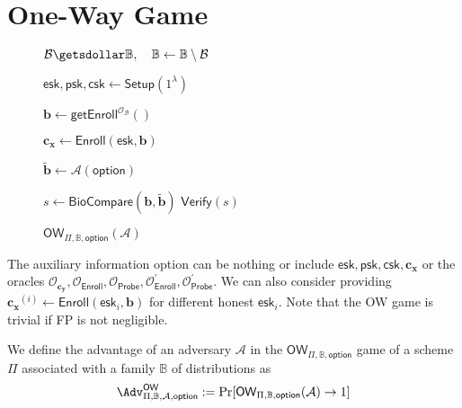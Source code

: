 
\newpage



\section{One-Way Game}

\begin{figure}[h]
\centering

	\begin{minipage}[t]{0.55\textwidth}
	\begin{algorithm}[H]
	\caption{$\textsf{OW}_{\Pi, \mathbb{B}, \textsf{option}}(\mathcal{A})$}
	\label{alg:ow_game}
	\begin{algorithmic}[1]

		\State $\mathcal{B} \getsdollar \mathbb{B}, \quad \mathbb{B} \gets \mathbb{B} \setminus \mathcal{B}$

		\State $\textsf{esk}, \textsf{psk}, \textsf{csk} \gets \textsf{Setup}(1^\lambda)$

		\State $\mathbf{b} \gets \textsf{getEnroll}^{\mathcal{O}_{\mathcal{B}}}()$

		\State $\mathbf{c_x} \gets \textsf{Enroll}(\textsf{esk}, \mathbf{b})$

		\State $\mathbf{\tilde{b}} \gets \mathcal{A}( \textsf{option} )$

		\State $s \gets \textsf{BioCompare}(\mathbf{b}, \mathbf{\tilde{b}})$
		\State \Return $ \textsf{Verify}(s) $
	\end{algorithmic}
	\end{algorithm}
	\end{minipage}

\label{fig:ow_game}
\end{figure}

The auxiliary information \textsf{option} can be nothing or include $\textsf{esk}, \textsf{psk}, \textsf{csk}, \mathbf{c_x}$ or the oracles $\mathcal{O}_{\mathbf{c_y}}, \mathcal{O}_{\textsf{Enroll}}, \mathcal{O}_{\textsf{Probe}}, \mathcal{O}^\prime_{\textsf{Enroll}}, \mathcal{O}^\prime_{\textsf{Probe}}$. We can also consider providing $\mathbf{c_x}^{(i)} \gets \textsf{Enroll}(\textsf{esk}_i, \mathbf{b})$ for different honest $\textsf{esk}_i$. Note that the \textsf{OW} game is trivial if \textsf{FP} is not negligible.

We define the advantage of an adversary $\mathcal{A}$ in the $\textsf{OW}_{\Pi, \mathbb{B}, \textsf{option}}$ game of a scheme $\Pi$ associated with a family $\mathbb{B}$ of distributions as
\[
	\Adv^{\textsf{OW}}_{\Pi, \mathbb{B}, \mathcal{A}, \textsf{option}} := \Pr[\textsf{OW}_{\Pi, \mathbb{B}, \textsf{option}}(\mathcal{A}) \to 1]
\]

